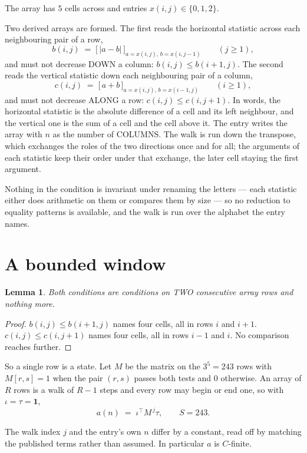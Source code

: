 \documentclass[11pt,a4paper]{article}
\theoremstyle{plain}
\newtheorem{lemma}[theorem]{Lemma}
\theoremstyle{definition}
\begin{document}
The array has $5$ cells across and entries $x(i,j)\in\{0,1,2\}$.

Two derived arrays are formed. The first reads the horizontal statistic across each
neighbouring pair of a row,
\[
b(i,j)\;=\;\bigl[\,\lvert a-b\rvert\,\bigr]_{a=x(i,j),\,b=x(i,j-1)}\qquad (j\ge1),
\]
and must not decrease DOWN a column: $b(i,j)\le b(i{+}1,j)$. The second reads the vertical
statistic down each neighbouring pair of a column,
\[
c(i,j)\;=\;\bigl[\,a+b\,\bigr]_{a=x(i,j),\,b=x(i{-}1,j)}\qquad (i\ge1),
\]
and must not decrease ALONG a row: $c(i,j)\le c(i,j{+}1)$. In words, the horizontal statistic
is the absolute difference of a cell and its left neighbour, and the vertical one is
the sum of a cell and the cell above it. The entry writes the array with $n$ as the number of COLUMNS. The walk is run down the transpose, which exchanges the roles of the two directions once and for all; the arguments of each statistic keep their order under that exchange, the later cell staying the first argument.

Nothing in the condition is invariant under renaming the letters --- each statistic either does
arithmetic on them or compares them by size --- so no reduction to equality patterns is
available, and the walk is run over the alphabet the entry names.

\section{A bounded window}

\begin{lemma}\label{lem:win}
Both conditions are conditions on TWO consecutive array rows and nothing more.
\end{lemma}

\begin{proof}
$b(i,j)\le b(i{+}1,j)$ names four cells, all in rows $i$ and $i+1$. $c(i,j)\le c(i,j{+}1)$
names four cells, all in rows $i-1$ and $i$. No comparison reaches further.
\end{proof}

So a single row is a state. Let $M$ be the matrix on the $3^{5}=243$ rows with
$M[r,s]=1$ when the pair $(r,s)$ passes both tests and $0$ otherwise. An array of $R$ rows is a
walk of $R-1$ steps and every row may begin or end one, so with $\iota=\tau=\mathbf{1}$,
\[
a(n)\;=\;\iota^{\!\top}M^{\,j}\tau ,\qquad S=243.
\]

The walk index $j$ and the entry's own $n$ differ by a constant, read off by matching the
published terms rather than assumed. In particular $a$ is $C$-finite.
\end{document}
